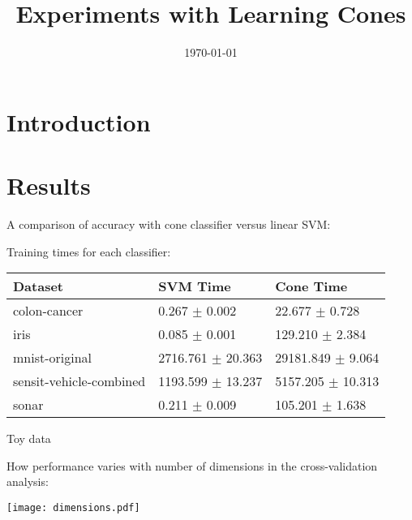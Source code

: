 \documentclass{article}
\title{Experiments with Learning Cones}
\date{\today}
\begin{document}
\maketitle

\section{Introduction}



\section{Results}

A comparison of accuracy with cone classifier versus linear SVM:
\begin{center}
\end{center}

Training times for each classifier:
\begin{center}
\begin{tabular}{|l|l|l|}
\hline
Dataset & SVM Time & Cone Time\\
\hline
colon-cancer & 0.267 $\pm$ 0.002 & 22.677 $\pm$ 0.728\\
iris & 0.085 $\pm$ 0.001 & 129.210 $\pm$ 2.384\\
mnist-original & 2716.761 $\pm$ 20.363 & 29181.849 $\pm$ 9.064\\
sensit-vehicle-combined & 1193.599 $\pm$ 13.237 & 5157.205 $\pm$ 10.313\\
sonar & 0.211 $\pm$ 0.009 & 105.201 $\pm$ 1.638\\
\hline
\end{tabular}
\end{center}

Toy data
\begin{center}
\end{center}

\newpage
How performance varies with number of dimensions in the
cross-validation analysis:

\begin{center}
\texttt{[image: dimensions.pdf]}
\end{center}
\end{document}
